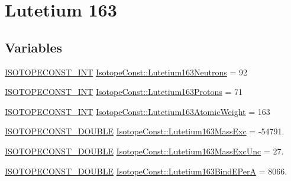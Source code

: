 \hypertarget{group___isotope_const-_lutetium-_lu163}{}\section{Lutetium 163}
\label{group___isotope_const-_lutetium-_lu163}
\subsection*{Variables}
\begin{DoxyCompactItemize}
\item 
\mbox{\hyperlink{group___isotope_const-_macros_ga5f18360b3e99483a35c32d789e62621c}{I\+S\+O\+T\+O\+P\+E\+C\+O\+N\+S\+T\+\_\+\+I\+NT}} \mbox{\hyperlink{group___isotope_const-_lutetium-_lu163_ga13cb7f4f0274a21c65e0bd7b9f508bfa}{Isotope\+Const\+::\+Lutetium163\+Neutrons}} = 92
\item 
\mbox{\hyperlink{group___isotope_const-_macros_ga5f18360b3e99483a35c32d789e62621c}{I\+S\+O\+T\+O\+P\+E\+C\+O\+N\+S\+T\+\_\+\+I\+NT}} \mbox{\hyperlink{group___isotope_const-_lutetium-_lu163_gaaa7e1a467bcb1aa90b1e0cb8554d4be0}{Isotope\+Const\+::\+Lutetium163\+Protons}} = 71
\item 
\mbox{\hyperlink{group___isotope_const-_macros_ga5f18360b3e99483a35c32d789e62621c}{I\+S\+O\+T\+O\+P\+E\+C\+O\+N\+S\+T\+\_\+\+I\+NT}} \mbox{\hyperlink{group___isotope_const-_lutetium-_lu163_gac9ed302ccd4efd9a7464c14fed2f21e7}{Isotope\+Const\+::\+Lutetium163\+Atomic\+Weight}} = 163
\item 
\mbox{\hyperlink{group___isotope_const-_macros_ga8f45a7272ce02c0b4c65c44636ed719a}{I\+S\+O\+T\+O\+P\+E\+C\+O\+N\+S\+T\+\_\+\+D\+O\+U\+B\+LE}} \mbox{\hyperlink{group___isotope_const-_lutetium-_lu163_ga9c179411796db01c929cadeea27537b1}{Isotope\+Const\+::\+Lutetium163\+Mass\+Exc}} = -\/54791.
\item 
\mbox{\hyperlink{group___isotope_const-_macros_ga8f45a7272ce02c0b4c65c44636ed719a}{I\+S\+O\+T\+O\+P\+E\+C\+O\+N\+S\+T\+\_\+\+D\+O\+U\+B\+LE}} \mbox{\hyperlink{group___isotope_const-_lutetium-_lu163_gad4874ca88bfdcd8fdf7afe51a57aa98d}{Isotope\+Const\+::\+Lutetium163\+Mass\+Exc\+Unc}} = 27.
\item 
\mbox{\hyperlink{group___isotope_const-_macros_ga8f45a7272ce02c0b4c65c44636ed719a}{I\+S\+O\+T\+O\+P\+E\+C\+O\+N\+S\+T\+\_\+\+D\+O\+U\+B\+LE}} \mbox{\hyperlink{group___isotope_const-_lutetium-_lu163_ga255c490632e2b02491a960ba7b43b167}{Isotope\+Const\+::\+Lutetium163\+Bind\+E\+PerA}} = 8066.
\item 

\end{DoxyCompactItemize}
